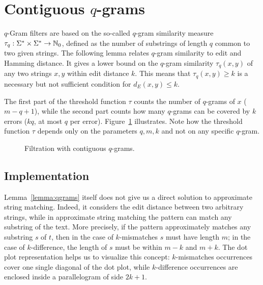 
\section{Contiguous $q$-grams}

$q$-Gram filters are based on the so-called $q$-gram similarity measure $\tau_q : \Sigma^{*} \times \Sigma^{*} \rightarrow \mathbb {N}_0$, defined as the number of substrings of length $q$ common to two given strings.
The following lemma relates $q$-gram similarity to edit and Hamming distance.
It gives a lower bound on the $q$-gram similarity $\tau_q(x,y)$ of any two strings $x,y$ within edit distance $k$.
This means that $\tau_q(x,y) \geq k$ is a necessary but not sufficient condition for $d_E(x,y) \leq k$.
The first part of the threshold function $\tau$ counts the number of $q$-grams of $x$ (\ie $m - q + 1$), while the second part counts how many $q$-grams can be covered by $k$ errors ($kq$, \ie at most $q$ per error).
Figure~\ref{fig:qgrams-ext} illustrates.
Note how the threshold function $\tau$ depends only on the parameters $q,m,k$ and not on any specific $q$-gram.

\begin{figure}[h]
\begin{center}
\caption[Filtration with contiguous $q$-grams] {Filtration with contiguous $q$-grams.}
\label{fig:qgrams-ext}

\end{center}
\end{figure}

\subsection{Implementation}

Lemma~\ref{lemma:qgrams} itself does not give us a direct solution to approximate string matching.
Indeed, it considers the edit distance between two arbitrary strings, while in approximate string matching the pattern can match any substring of the text.
More precisely, if the pattern approximately matches any substring $s$ of $t$, then in the case of $k$-mismatches $s$ must have length $m$; in the case of $k$-difference, the length of $s$ must be within $m - k$ and $m + k$.
The dot plot representation helps us to visualize this concept: $k$-mismatches occurrences cover one single diagonal of the dot plot, while $k$-difference occurrences are enclosed inside a parallelogram of side $2k+1$.

